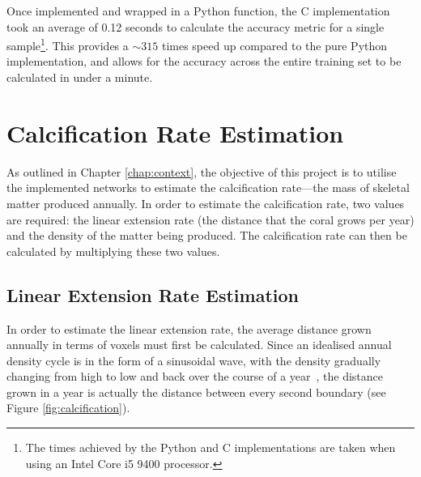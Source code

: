 Once implemented and wrapped in a Python function, the C implementation took an average of 0.12 seconds to calculate the accuracy metric for a single sample\footnote{The times achieved by the Python and C implementations are taken when using an Intel Core i5 9400 processor.}. This provides a ${\sim}315$ times speed up compared to the pure Python implementation, and allows for the accuracy across the entire training set to be calculated in under a minute.

\section{Calcification Rate Estimation}
\label{sec:calcificationimplementation}

As outlined in Chapter \ref{chap:context}, the objective of this project is to utilise the implemented networks to estimate the calcification rate---the mass of skeletal matter produced annually. In order to estimate the calcification rate, two values are required: the linear extension rate (the distance that the coral grows per year) and the density of the matter being produced. The calcification rate can then be calculated by multiplying these two values.

\subsection{Linear Extension Rate Estimation}

In order to estimate the linear extension rate, the average distance grown annually in terms of voxels must first be calculated. Since an idealised annual density cycle is in the form of a sinusoidal wave, with the density gradually changing from high to low and back over the course of a year~\cite[p. 39]{coralsine}, the distance grown in a year is actually the distance between every second boundary (see Figure \ref{fig:calcification}).

